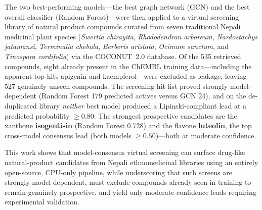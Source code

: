 \begin{onehalfspace}
\vspace{0.3cm}
\noindent
The two best-performing models---the best graph network (GCN) and
the best overall classifier (Random Forest)---were then applied to a
virtual screening library of natural product compounds curated from
seven traditional Nepali medicinal plant species
(\textit{Swertia chirayita}, \textit{Rhododendron arboreum},
\textit{Nardostachys jatamansi}, \textit{Terminalia chebula},
\textit{Berberis aristata}, \textit{Ocimum sanctum}, and
\textit{Tinospora cordifolia}) via the COCONUT~2.0 database. Of the
535 retrieved compounds, eight already present in the ChEMBL training
data---including the apparent top hits apigenin and kaempferol---were
excluded as leakage, leaving 527 genuinely unseen compounds. The
screening hit list proved strongly model-dependent (Random Forest 179
predicted actives versus GCN 24), and on the de-duplicated library
\emph{neither} best model produced a Lipinski-compliant lead at a
predicted probability $\geq 0.80$. The strongest prospective
candidates are the xanthone \textbf{isogentisin} (Random Forest 0.728)
and the flavone \textbf{luteolin}, the top cross-model consensus lead
(both models $\geq 0.50$)---both at moderate confidence.

\vspace{0.3cm}
\noindent
This work shows that model-consensus virtual screening can surface
drug-like natural-product candidates from Nepali ethnomedicinal
libraries using an entirely open-source, CPU-only pipeline, while
underscoring that such screens are strongly model-dependent, must
exclude compounds already seen in training to remain genuinely
prospective, and yield only moderate-confidence leads requiring
experimental validation.
\end{onehalfspace}

\vspace{0.5cm}
